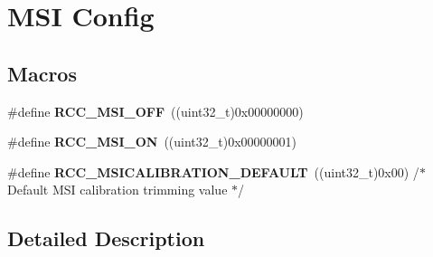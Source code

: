 \hypertarget{group___r_c_c___m_s_i___config}{\section{M\-S\-I Config}
\label{group___r_c_c___m_s_i___config}
}
\subsection*{Macros}
\begin{DoxyCompactItemize}
\item 
\hypertarget{group___r_c_c___m_s_i___config_gac80ce94ec4b5a82e2f3a36abb7cc017a}{\#define {\bfseries R\-C\-C\-\_\-\-M\-S\-I\-\_\-\-O\-F\-F}~((uint32\-\_\-t)0x00000000)}\label{group___r_c_c___m_s_i___config_gac80ce94ec4b5a82e2f3a36abb7cc017a}

\item 
\hypertarget{group___r_c_c___m_s_i___config_gabf942d45be1bc843650abc9e79426739}{\#define {\bfseries R\-C\-C\-\_\-\-M\-S\-I\-\_\-\-O\-N}~((uint32\-\_\-t)0x00000001)}\label{group___r_c_c___m_s_i___config_gabf942d45be1bc843650abc9e79426739}

\item 
\hypertarget{group___r_c_c___m_s_i___config_ga70bb1809b5ba2dd69171f8f1c4d91728}{\#define {\bfseries R\-C\-C\-\_\-\-M\-S\-I\-C\-A\-L\-I\-B\-R\-A\-T\-I\-O\-N\-\_\-\-D\-E\-F\-A\-U\-L\-T}~((uint32\-\_\-t)0x00)   /$\ast$ Default M\-S\-I calibration trimming value $\ast$/}\label{group___r_c_c___m_s_i___config_ga70bb1809b5ba2dd69171f8f1c4d91728}

\end{DoxyCompactItemize}


\subsection{Detailed Description}
